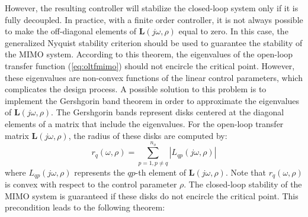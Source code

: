 \documentclass[A4, 10pt, conference]{ieeeconf}
\renewcommand{\vec}[1]{\mathbf{#1}}
\begin{document}
However, the resulting controller will stabilize the closed-loop system only if it is fully decoupled. In practice, with a finite order controller, it is not always possible to make the off-diagonal elements of  $\vec{L}(j\omega,\rho)$ equal to zero. In this case, the generalized Nyquist stability criterion should be used to guarantee the stability of the MIMO system. According to this theorem, the eigenvalues of the open-loop transfer function (\ref{eq:oltfmimo}) should not encircle the critical point. However, these eigenvalues are non-convex functions of the linear control parameters, which complicates the design process. A possible solution to this problem is to implement the Gershgorin band theorem in order to approximate the eigenvalues of $\vec{L}(j\omega,\rho)$. The Gershgorin bands represent disks centered at the diagonal elements of a matrix that include the eigenvalues.  For the open-loop transfer matrix $\vec{L}(j\omega,\rho)$, the radius of these disks are computed by: 
\begin{equation}
r_{q}(\omega,\rho)=\sum_{p=1,p\neq q}^{n_o} |L_{qp}(j\omega,\rho)| 
\end{equation}
where $L_{qp}(j\omega,\rho)$ represents the $qp$-th element of $\vec{L}(j\omega,\rho)$. Note that $r_{q}(\omega,\rho)$ is convex with respect to the control parameter $\rho$. The closed-loop stability of the MIMO system is guaranteed if these disks do not encircle the critical point. This precondition leads to the following theorem:
\end{document}

